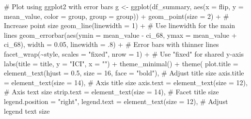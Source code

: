 \documentclass[
  letterpaper,
  DIV=11,
  numbers=noendperiod]{scrartcl}
\newenvironment{Shaded}{\begin{snugshade}}{\end{snugshade}}
\newcommand{\AttributeTok}[1]{\textcolor[rgb]{0.40,0.45,0.13}{#1}}
\newcommand{\CommentTok}[1]{\textcolor[rgb]{0.37,0.37,0.37}{#1}}
\newcommand{\DecValTok}[1]{\textcolor[rgb]{0.68,0.00,0.00}{#1}}
\newcommand{\FloatTok}[1]{\textcolor[rgb]{0.68,0.00,0.00}{#1}}
\newcommand{\FunctionTok}[1]{\textcolor[rgb]{0.28,0.35,0.67}{#1}}
\newcommand{\NormalTok}[1]{\textcolor[rgb]{0.00,0.23,0.31}{#1}}
\newcommand{\OtherTok}[1]{\textcolor[rgb]{0.00,0.23,0.31}{#1}}
\newcommand{\SpecialCharTok}[1]{\textcolor[rgb]{0.37,0.37,0.37}{#1}}
\newcommand{\StringTok}[1]{\textcolor[rgb]{0.13,0.47,0.30}{#1}}
\begin{document}
\begin{Shaded}
\begin{Highlighting}[]
  \CommentTok{\# Plot using ggplot2 with error bars}
\NormalTok{  g }\OtherTok{\textless{}{-}} \FunctionTok{ggplot}\NormalTok{(df\_summary, }\FunctionTok{aes}\NormalTok{(}\AttributeTok{x =}\NormalTok{ flip, }\AttributeTok{y =}\NormalTok{ mean\_value, }\AttributeTok{color =}\NormalTok{ group, }\AttributeTok{group =}\NormalTok{ group)) }\SpecialCharTok{+}
    \FunctionTok{geom\_point}\NormalTok{(}\AttributeTok{size =} \DecValTok{2}\NormalTok{) }\SpecialCharTok{+}  \CommentTok{\# Increase point size}
    \FunctionTok{geom\_line}\NormalTok{(}\AttributeTok{linewidth =} \DecValTok{1}\NormalTok{) }\SpecialCharTok{+}  \CommentTok{\# Use linewidth for the main lines}
    \FunctionTok{geom\_errorbar}\NormalTok{(}\FunctionTok{aes}\NormalTok{(}\AttributeTok{ymin =}\NormalTok{ mean\_value }\SpecialCharTok{{-}}\NormalTok{ ci\_68, }\AttributeTok{ymax =}\NormalTok{ mean\_value }\SpecialCharTok{+}\NormalTok{ ci\_68), }\AttributeTok{width =} \FloatTok{0.05}\NormalTok{, }\AttributeTok{linewidth =}\NormalTok{ .}\DecValTok{8}\NormalTok{) }\SpecialCharTok{+}  \CommentTok{\# Error bars with thinner lines}
    \FunctionTok{facet\_wrap}\NormalTok{(}\SpecialCharTok{\textasciitilde{}}\NormalTok{style, }\AttributeTok{scales =} \StringTok{"fixed"}\NormalTok{, }\AttributeTok{nrow =} \DecValTok{1}\NormalTok{) }\SpecialCharTok{+}  \CommentTok{\# Use "fixed" for shared y{-}axis}
    \FunctionTok{labs}\NormalTok{(}\AttributeTok{title =}\NormalTok{ title, }\AttributeTok{y =} \StringTok{"ICI"}\NormalTok{, }\AttributeTok{x =} \StringTok{""}\NormalTok{) }\SpecialCharTok{+}
    \FunctionTok{theme\_minimal}\NormalTok{() }\SpecialCharTok{+}
    \FunctionTok{theme}\NormalTok{(}
      \AttributeTok{plot.title =} \FunctionTok{element\_text}\NormalTok{(}\AttributeTok{hjust =} \FloatTok{0.5}\NormalTok{, }\AttributeTok{size =} \DecValTok{16}\NormalTok{, }\AttributeTok{face =} \StringTok{"bold"}\NormalTok{),  }\CommentTok{\# Adjust title size}
      \AttributeTok{axis.title =} \FunctionTok{element\_text}\NormalTok{(}\AttributeTok{size =} \DecValTok{14}\NormalTok{),  }\CommentTok{\# Axis title size}
      \AttributeTok{axis.text =} \FunctionTok{element\_text}\NormalTok{(}\AttributeTok{size =} \DecValTok{12}\NormalTok{),   }\CommentTok{\# Axis text size}
      \AttributeTok{strip.text =} \FunctionTok{element\_text}\NormalTok{(}\AttributeTok{size =} \DecValTok{14}\NormalTok{),  }\CommentTok{\# Facet title size}
      \AttributeTok{legend.position =} \StringTok{"right"}\NormalTok{,}
      \AttributeTok{legend.text =} \FunctionTok{element\_text}\NormalTok{(}\AttributeTok{size =} \DecValTok{12}\NormalTok{),  }\CommentTok{\# Adjust legend text size}

\end{Highlighting}
\end{Shaded}
\end{document}
